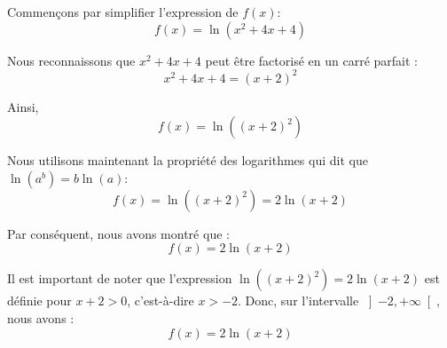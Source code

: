 \documentclass[12pt]{article}
\begin{document}
Commençons par simplifier l'expression de \( f(x) \):
\[
f(x) = \ln(x^2 + 4x + 4)
\]

Nous reconnaissons que \( x^2 + 4x + 4 \) peut être factorisé en un carré parfait :
\[
x^2 + 4x + 4 = (x + 2)^2
\]

Ainsi,
\[
f(x) = \ln((x + 2)^2)
\]

Nous utilisons maintenant la propriété des logarithmes qui dit que \( \ln(a^b) = b \ln(a) \):
\[
f(x) = \ln((x + 2)^2) = 2 \ln(x + 2)
\]

Par conséquent, nous avons montré que :
\[
f(x) = 2 \ln(x + 2)
\]

Il est important de noter que l'expression \( \ln((x + 2)^2) = 2 \ln(x + 2) \) est définie pour \( x + 2 > 0 \), c'est-à-dire \( x > -2 \). Donc, sur l'intervalle \( \left]-2, +\infty \right[ \), nous avons :
\[
f(x) = 2 \ln(x + 2)
\]
\end{document}
